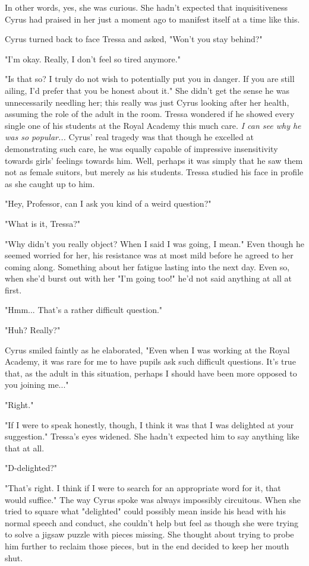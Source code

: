 In other words, yes, she was curious. She hadn't expected that inquisitiveness Cyrus had praised in her just a moment ago to manifest itself at a time like this.

Cyrus turned back to face Tressa and asked, "Won't you stay behind?"

"I'm okay. Really, I don't feel so tired anymore."

"Is that so? I truly do not wish to potentially put you in danger. If you are still ailing, I'd prefer that you be honest about it." She didn't get the sense he was unnecessarily needling her; this really was just Cyrus looking after her health, assuming the role of the adult in the room. Tressa wondered if he showed every single one of his students at the Royal Academy this much care. \emph{I can see why he was so popular...} Cyrus' real tragedy was that though he excelled at demonstrating such care, he was equally capable of impressive insensitivity towards girls' feelings towards him. Well, perhaps it was simply that he saw them not as female suitors, but merely as his students. Tressa studied his face in profile as she caught up to him.

"Hey, Professor, can I ask you kind of a weird question?"

"What is it, Tressa?"

"Why didn't you really object? When I said I was going, I mean." Even though he seemed worried for her, his resistance was at most mild before he agreed to her coming along. Something about her fatigue lasting into the next day. Even so, when she'd burst out with her "I'm going too!" he'd not said anything at all at first.

"Hmm... That's a rather difficult question."

"Huh? Really?"

Cyrus smiled faintly as he elaborated, "Even when I was working at the Royal Academy, it was rare for me to have pupils ask such difficult questions. It's true that, as the adult in this situation, perhaps I should have been more opposed to you joining me..."

"Right."

"If I were to speak honestly, though, I think it was that I was delighted at your suggestion." Tressa's eyes widened. She hadn't expected him to say anything like that at all.

"D-delighted?"

"That's right. I think if I were to search for an appropriate word for it, that would suffice." The way Cyrus spoke was always impossibly circuitous. When she tried to square what "delighted" could possibly mean inside his head with his normal speech and conduct, she couldn't help but feel as though she were trying to solve a jigsaw puzzle with pieces missing. She thought about trying to probe him further to reclaim those pieces, but in the end decided to keep her mouth shut.
\newline

